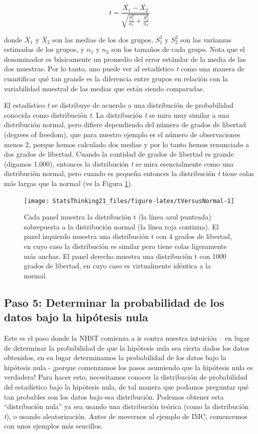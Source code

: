 \documentclass[
  12pt,
]{book}
\theoremstyle{definition}
\theoremstyle{definition}
\theoremstyle{definition}
\theoremstyle{remark}
\begin{document}
\[
t = \frac{\bar{X_1} - \bar{X_2}}{\sqrt{\frac{S_1^2}{n_1} + \frac{S_2^2}{n_2}}}
\]

donde \(\bar{X}_1\) y \(\bar{X}_2\) son las medias de los dos grupos, \(S^2_1\) y \(S^2_2\) son las varianzas estimadas de los grupos, y \(n_1\) y \(n_2\) son los tamaños de cada grupo. Nota que el denominador es básicamente un promedio del error estándar de la media de las dos muestras. Por lo tanto, uno puede ver al estadístico \emph{t} como una manera de cuantificar qué tan grande es la diferencia entre grupos en relación con la variabilidad muestral de las medias que están siendo comparadas.

El estadístico \emph{t} se distribuye de acuerdo a una distribución de probabilidad conocida como distribución \emph{t}. La distribución \emph{t} se mira muy similar a una distribución normal, pero difiere dependiendo del número de grados de libertad (degrees of freedom), que para nuestro ejemplo es el número de observaciones menos 2, porque hemos calculado dos medias y por lo tanto hemos renunciado a dos grados de libertad. Cuando la cantidad de grados de libertad es grande (digamos 1,000), entonces la distribución \emph{t} se mira esencialmente como una distribución normal, pero cuando es pequeña entonces la distribución \emph{t} tiene colas más largas que la normal (ve la Figura \ref{fig:tVersusNormal}).

\begin{figure}
\texttt{[image: StatsThinking21\_files/figure-latex/tVersusNormal-1]} \caption{Cada panel muestra la distribución t (la línea azul punteada) sobrepuesta a la distribución normal (la línea roja continua). El panel izquierdo muestra una distribución t con 4 grados de libertad, en cuyo caso la distribución es similar pero tiene colas ligeramente más anchas. El panel derecho muestra una distribución t con 1000 grados de libertad, en cuyo caso es virtualmente idéntica a la normal.}\label{fig:tVersusNormal}
\end{figure}

\hypertarget{paso-5-determinar-la-probabilidad-de-los-datos-bajo-la-hipuxf3tesis-nula}{%
\subsection{Paso 5: Determinar la probabilidad de los datos bajo la hipótesis nula}\label{paso-5-determinar-la-probabilidad-de-los-datos-bajo-la-hipuxf3tesis-nula}}

Este es el paso donde la NHST comienza a ir contra nuestra intuición -- en lugar de determinar la probabilidad de que la hipótesis nula sea cierta dados los datos obtenidos, en su lugar determinamos la probabilidad de los datos bajo la hipótesis nula - ¡porque comenzamos los pasos asumiendo que la hipótesis nula es verdadera! Para hacer esto, necesitamos conocer la distribución de probabilidad del estadístico bajo la hipótesis nula, de tal manera que podamos preguntar qué tan probables son los datos bajo esa distribución. Podemos obtener esta ``distribución nula'' ya sea usando una distribución teórica (como la distribución \emph{t}), o usando aleatorización. Antes de movernos al ejemplo de IMC, comencemos con unos ejemplos más sencillos.
\end{document}
